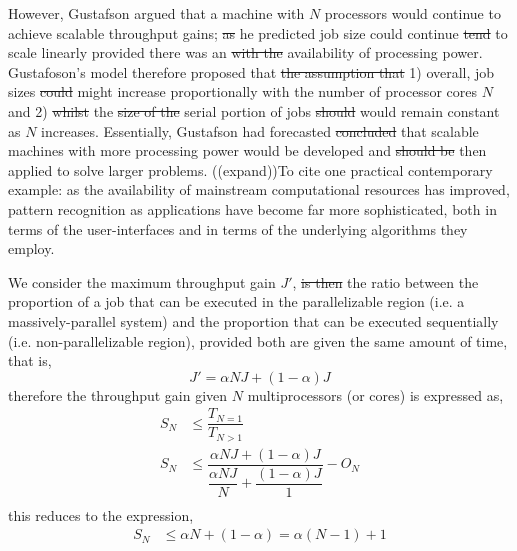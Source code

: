 \documentclass[10pt]{article}[draft]
\begin{document}
However, Gustafson argued that a machine with $N$ processors would continue to achieve scalable throughput gains; \st{as} he predicted job size could continue \st{tend} to scale linearly provided there was an \st{with the} availability of processing power. Gustafoson's model therefore proposed that \st{the assumption that} 1) overall, job sizes \st{could} might increase proportionally with the number of processor cores $N$ and 2) \st{whilst} the \st{size of the} serial portion of jobs \st{should} would remain constant as $N$ increases. Essentially, Gustafson had forecasted \st{concluded} that scalable machines with more processing power would be developed and \st{should be} then applied to solve larger problems. ((expand))To cite one practical contemporary example: as the availability of mainstream computational resources has improved, pattern recognition as applications have become far more sophisticated, both in terms of the user-interfaces and in terms of the underlying algorithms they employ.  

We consider the maximum throughput gain $J'$, \st{is then} the ratio between the proportion of a job that can be executed in the parallelizable region (i.e. a massively-parallel system)  and the proportion that can be executed sequentially (i.e. non-parallelizable region), provided both are given the same amount of time, that is,
\begin{equation}
 J' =  \alpha N J + (1 - \alpha) J 
\end{equation}
therefore the throughput gain given  $N$ multiprocessors (or cores) is expressed as,
\begin{equation}
	\begin{split}
		S_N	& \leq 	\dfrac{T_{N=1}}{T_{N>1}} \\
		S_N	& \leq  \dfrac{ \alpha N J + (1 - \alpha) J }{\dfrac{\alpha N J}{N} + \dfrac{(1 - \alpha) J}{1}} - O_N\\
	\end{split}
\end{equation}
this reduces to the expression,
\begin{equation}
	\begin{split}
		S_N	& \leq  { \alpha N  + (1 - \alpha)  } = \alpha (N -1) + 1
	\end{split}
	\label{Amdahl2}
\end{equation}
\end{document}
